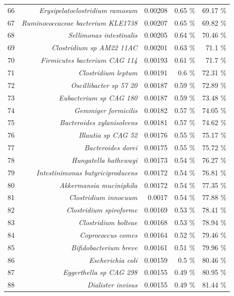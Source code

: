 \documentclass{article}
\begin{document}
\begin{table}[h]
\begin{centering}
\begin{tabular}{|r|r|r|r|r|}
      66 & \textit{Erysipelatoclostridium ramosum} & 0.00208 & 0.65 \% & 69.17 \% \\
      67 & \textit{Ruminococcaceae bacterium KLE1738} & 0.00207 & 0.65 \% & 69.82 \% \\
      68 & \textit{Sellimonas intestinalis} & 0.00205 & 0.64 \% & 70.46 \% \\
      69 & \textit{Clostridium sp AM22 11AC} & 0.00201 & 0.63 \% & 71.1 \% \\
      70 & \textit{Firmicutes bacterium CAG 114} & 0.00193 & 0.61 \% & 71.7 \% \\
      71 & \textit{Clostridium leptum} & 0.00191 & 0.6 \% & 72.31 \% \\
      72 & \textit{Oscillibacter sp 57 20} & 0.00187 & 0.59 \% & 72.89 \% \\
      73 & \textit{Eubacterium sp CAG 180} & 0.00187 & 0.59 \% & 73.48 \% \\
      74 & \textit{Gemmiger formicilis} & 0.00182 & 0.57 \% & 74.05 \% \\
      75 & \textit{Bacteroides xylanisolvens} & 0.00181 & 0.57 \% & 74.62 \% \\
      76 & \textit{Blautia sp CAG 52} & 0.00176 & 0.55 \% & 75.17 \% \\
      77 & \textit{Bacteroides dorei} & 0.00175 & 0.55 \% & 75.72 \% \\
      78 & \textit{Hungatella hathewayi} & 0.00173 & 0.54 \% & 76.27 \% \\
      79 & \textit{Intestinimonas butyriciproducens} & 0.00172 & 0.54 \% & 76.81 \% \\
      80 & \textit{Akkermansia muciniphila} & 0.00172 & 0.54 \% & 77.35 \% \\
      81 & \textit{Clostridium innocuum} & 0.0017 & 0.54 \% & 77.88 \% \\
      82 & \textit{Clostridium spiroforme} & 0.00169 & 0.53 \% & 78.41 \% \\
      83 & \textit{Clostridium bolteae} & 0.00168 & 0.53 \% & 78.94 \% \\
      84 & \textit{Coprococcus comes} & 0.00164 & 0.52 \% & 79.46 \% \\
      85 & \textit{Bifidobacterium breve} & 0.00161 & 0.51 \% & 79.96 \% \\
      86 & \textit{Escherichia coli} & 0.00159 & 0.5 \% & 80.46 \% \\
      87 & \textit{Eggerthella sp CAG 298} & 0.00155 & 0.49 \% & 80.95 \% \\
      88 & \textit{Dialister invisus} & 0.00155 & 0.49 \% & 81.44 \% \\

\end{tabular}
\end{centering}
\end{table}
\end{document}
